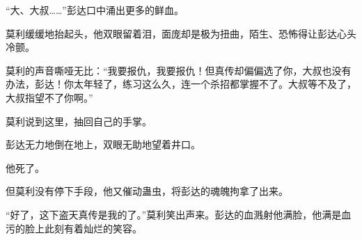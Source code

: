 \begin{this_body}
“大、大叔……”彭达口中涌出更多的鲜血。

莫利缓缓地抬起头，他双眼留着泪，面庞却是极为扭曲，陌生、恐怖得让彭达心头冷颤。

莫利的声音嘶哑无比：“我要报仇，我要报仇！但真传却偏偏选了你，大叔也没有办法，彭达！你太年轻了，练习这么久，连一个杀招都掌握不了。大叔等不及了，大叔指望不了你啊。”

莫利说到这里，抽回自己的手掌。

彭达无力地倒在地上，双眼无助地望着井口。

他死了。

但莫利没有停下手段，他又催动蛊虫，将彭达的魂魄拘拿了出来。

“好了，这下盗天真传是我的了。”莫利笑出声来。彭达的血溅射他满脸，他满是血污的脸上此刻有着灿烂的笑容。

\end{this_body}

